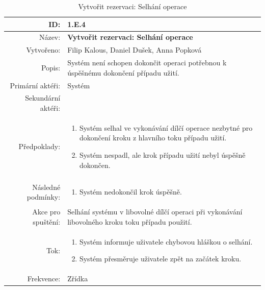 \documentclass[a4paper,10pt]{article}
\begin{document}
\newpage 
\begin{center}
\begin{table}[ht!]
{\renewcommand{\arraystretch}{1.3}
\begin{tabular}{| r | p{12cm} |}
	\hline
	ID: & 1.E.4 \\
    \hline
    Název: & \textbf{Vytvořit rezervaci: Selhání operace} \\
    \hline
    Vytvořeno: & Filip Kalous, Daniel Dušek, Anna Popková \\
    \hline
    Popis: & Systém není schopen dokončit operaci potřebnou k úspěšnému dokončení případu užití. \\
    \hline
    Primární aktéři: & Systém \\
    \hline
    Sekundární aktéři: &  \\
    \hline
    Předpoklady: & 
    \begin{minipage}[t]{0.75\textwidth}
    	\begin{enumerate}[nosep,after=\strut]
    		\item Systém selhal ve vykonávání dílčí operace nezbytné pro dokončení kroku z hlavního toku případu užití.
            \item Systém nespadl, ale krok případu užití nebyl úspěšně dokončen.
    	\end{enumerate}
  	\end{minipage} \\
    \hline
    Následné podmínky: & 
    \begin{minipage}[t]{0.75\textwidth}
    	\begin{enumerate}[nosep,after=\strut]
    		\item Systém nedokončil krok úspěšně.
    	\end{enumerate}
  	\end{minipage} \\
	\hline
    Akce pro spuštění: & Selhání systému v libovolné dílčí operaci při vykonávání libovolného kroku toku případu použití. \\
    \hline
    Tok: & 
    \begin{minipage}[t]{0.75\textwidth}
    	\begin{enumerate}[nosep,after=\strut]
            \item Systém informuje uživatele chybovou hláškou o selhání.
            \item Systém přesměruje uživatele zpět na začátek kroku.
    	\end{enumerate}
  	\end{minipage} \\
    \hline
    Frekvence: & Zřídka \\
    \hline
\end{tabular}}
\caption{Vytvořit rezervaci: Selhání operace}
\label{table:4}
\end{table}
\end{center}
\end{document}
